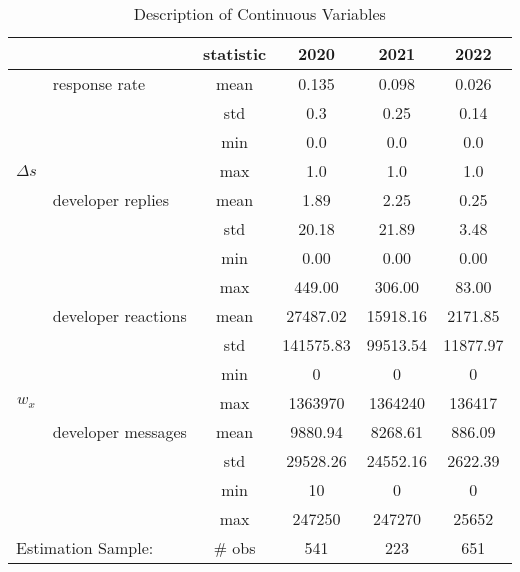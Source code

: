 \documentclass[13pt]{article}
\numberwithin{figure}{section}
\numberwithin{table}{section}
\theoremstyle{indented}
\numberwithin{equation}{section} %
\begin{document}
   \begin{table}[t]
   \centering
       \caption{Description of Continuous Variables} 
  \label{table:cont} 
  \begin{tabular}{|c|l|c|c|c|c|}
\hline
                 &  & statistic &           2020 &          2021 &         2022 \\
\hline
 &response rate & mean &       0.135 &      0.098 &       0.026 \\
  &                 & std &       0.3 &      0.25 &     0.14 \\
 &                  & min &            0.0 &           0.0 &          0.0 \\
$\Delta s$    &               & max &            1.0 &           1.0 &          1.0 \\


 &developer replies & mean &    1.89 &    2.25 &   0.25 \\
&      & std &   20.18 &   21.89 &   3.48 \\
 &     & min &    0.00 &    0.00 &   0.00 \\
  &    & max &  449.00 &  306.00 &  83.00 \\



\hline
&developer reactions & mean &   27487.02 &  15918.16 &   2171.85 \\
 &                  & std &  141575.83 &  99513.54 &  11877.97 \\
  &                 & min &              0 &             0 &            0 \\
   $w_x$ &                & max &        1363970 &       1364240 &       136417 \\
&developer messages & mean &    9880.94 &   8268.61 &    886.09 \\
&                   & std &   29528.26 &   24552.16 &  2622.39 \\
&                   & min &             10 &             0 &            0 \\
&                   & max &         247250 &        247270 &        25652 \\
\hline
\multicolumn{2}{|l|}{Estimation Sample: } & \# obs &   541 & 223 & 651 \\
\hline
\end{tabular}
    \end{table} 
\end{document}
